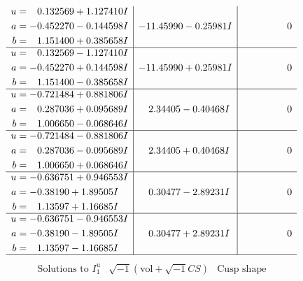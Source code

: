 \documentclass[1p]{elsarticle_modified}
\theoremstyle{definition}
\newcommand{\I}{\sqrt{-1}}
\begin{document}
$$\begin{array}{c|c|c}
\begin{aligned}
u &= \phantom{-}0.132569 + 1.127410 I \\
a &= -0.452270 - 0.144598 I \\
b &= \phantom{-}1.151400 + 0.385658 I\end{aligned}
 & -11.45990 - 0.25981 I & \phantom{-0.000000 } 0 \\ \hline\begin{aligned}
u &= \phantom{-}0.132569 - 1.127410 I \\
a &= -0.452270 + 0.144598 I \\
b &= \phantom{-}1.151400 - 0.385658 I\end{aligned}
 & -11.45990 + 0.25981 I & \phantom{-0.000000 } 0 \\ \hline\begin{aligned}
u &= -0.721484 + 0.881806 I \\
a &= \phantom{-}0.287036 + 0.095689 I \\
b &= \phantom{-}1.006650 - 0.068646 I\end{aligned}
 & \phantom{-}2.34405 - 0.40468 I & \phantom{-0.000000 } 0 \\ \hline\begin{aligned}
u &= -0.721484 - 0.881806 I \\
a &= \phantom{-}0.287036 - 0.095689 I \\
b &= \phantom{-}1.006650 + 0.068646 I\end{aligned}
 & \phantom{-}2.34405 + 0.40468 I & \phantom{-0.000000 } 0 \\ \hline\begin{aligned}
u &= -0.636751 + 0.946553 I \\
a &= -0.38190 + 1.89505 I \\
b &= \phantom{-}1.13597 + 1.16685 I\end{aligned}
 & \phantom{-}0.30477 - 2.89231 I & \phantom{-0.000000 } 0 \\ \hline\begin{aligned}
u &= -0.636751 - 0.946553 I \\
a &= -0.38190 - 1.89505 I \\
b &= \phantom{-}1.13597 - 1.16685 I\end{aligned}
 & \phantom{-}0.30477 + 2.89231 I & \phantom{-0.000000 } 0\\
 \hline 
 \end{array}$$\newpage$$\begin{array}{c|c|c}  
\text{Solutions to }I^u_{1}& \I (\text{vol} + \sqrt{-1}CS) & \text{Cusp shape}\\
 \hline 
\begin{aligned}

\end{aligned}
\end{array}$$
\end{document}

